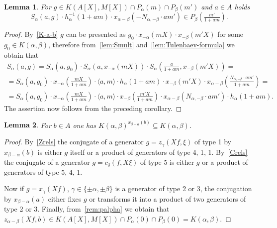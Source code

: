 \documentclass[oneside, 8pt]{amsart}
\newtheorem{lemma}{Lemma}
\theoremstyle{remark}
\theoremstyle{definition}
\numberwithin{lemma}{section}
\numberwithin{prop}{section}
\numberwithin{corollary}{section}
\numberwithin{externaltheorem}{section}
\numberwithin{equation}{section}
\begin{document}
\begin{lemma} \label{SR:sharp} For $g \in K(A[X], M[X]) \cap P_\alpha(m) \cap P_\beta(m')$ and $a \in A$ holds \[S_\alpha(a, g)\cdot  h^{-1}_\alpha(1 + am) \cdot x_{\alpha-\beta}(-N_{\alpha,-\beta}\cdot am') \in P_\beta\left(\tfrac{m'}{1 + am}\right). \] \end{lemma}
\begin{proof} By~\cref{K-a-b} $g$ can be presented as $ g_0 \cdot x_{-\alpha}(mX) \cdot x_{-\beta}(m'X)$ for some $g_0\in K(\alpha, \beta)$, therefore from~\cref{lem:Smult} and~\cref{lem:Tulenbaev-formula} we obtain that \begin{multline} \nonumber S_\alpha(a, g) = S_\alpha(a, g_0) \cdot S_\alpha(a, x_{-\alpha}(mX)) \cdot S_\alpha\left(\tfrac{a}{1+am}, x_{-\beta}(m'X)\right) = \\ = S_\alpha(a, g_0) \cdot x_{-\alpha}\left(\tfrac{mX}{1+am}\right) \cdot \langle a, m \rangle \cdot h_\alpha(1+am) \cdot x_{-\beta}(m'X) \cdot x_{\alpha-\beta}\left(\tfrac{N_{\alpha, -\beta} \cdot am'}{1+am}\right) = \\ = S_\alpha(a, g_0) \cdot x_{-\alpha}\left(\tfrac{mX}{1+am}\right) \cdot \langle a, m \rangle \cdot  x_{-\beta}\left(\tfrac{m'X}{1+am}\right) \cdot x_{\alpha-\beta}\left(N_{\alpha, -\beta} \cdot am'\right) \cdot h_\alpha(1+am). \end{multline}
The assertion now follows from the preceding corollary.
\end{proof}
  
\begin{lemma} \label{conj-K-a-b} For $b \in A$ one has $K(\alpha, \beta)^{x_{\beta - \alpha}(b)} \subseteq K(\alpha, \beta)$. \end{lemma}
\begin{proof} By~\cref{Zrels} the conjugate of a generator $g = z_\gamma(Xf, \xi)$ of type 1 by $x_{\beta-\alpha}(b)$ is either $g$ itself or a product of generators of type 4, 1, 1. By~\cref{Crels} the conjugate of a generator $g = c_\delta(f, X\xi)$ of type 5 is either $g$ or a product of generators of type 5, 4, 1.

Now if $g = x_\gamma(Xf)$, $\gamma \in \{\pm \alpha, \pm \beta\}$ is a generator of type 2 or 3, the conjugation by $x_{\beta-\alpha}(a)$ either fixes $g$ or transforms it into a product of two generators of type 2 or 3.  Finally, from~\cref{rem:palpha} we obtain that $z_{\alpha-\beta}(Xf, b) \in K(A[X], M[X]) \cap P_\alpha(0) \cap P_{\beta}(0) = K(\alpha, \beta)$. \end{proof} 
\end{document}
